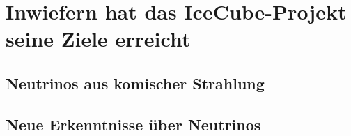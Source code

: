 \chapter{Inwiefern hat das IceCube-Projekt seine Ziele erreicht} 
    \vspace{8pt}
    \section{Neutrinos aus komischer Strahlung}
    \section{Neue Erkenntnisse über Neutrinos}